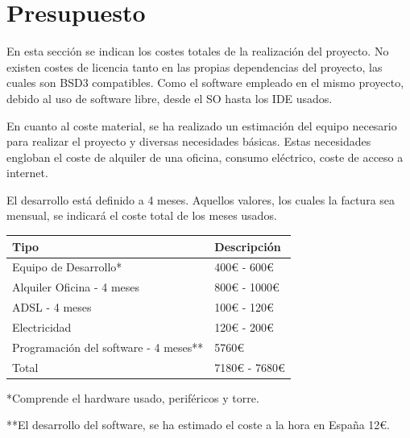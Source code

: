 \documentclass[11pt]{article}
\begin{document}
\section{Presupuesto}
\label{sec:orgf4fb4df}

En esta sección se indican los costes totales de la realización del proyecto. No existen costes de
licencia tanto en las propias dependencias del proyecto, las cuales son BSD3 compatibles. Como el software
empleado en el mismo proyecto, debido al uso de software libre, desde el SO hasta los IDE usados.

En cuanto al coste material, se ha realizado un estimación del equipo necesario para realizar el proyecto y diversas necesidades básicas.
Estas necesidades engloban el coste de alquiler de una oficina, consumo eléctrico, coste de acceso a internet.

El desarrollo está definido a 4 meses. Aquellos valores, los cuales la factura sea mensual, se indicará el coste total de los meses usados.

\begin{center}
\begin{tabular}{ll}
Tipo & Descripción\\
\hline
Equipo de Desarrollo* & 400€ - 600€\\
Alquiler Oficina - 4 meses & 800€ - 1000€\\
ADSL - 4 meses & 100€ - 120€\\
Electricidad & 120€ - 200€\\
Programación del software - 4 meses** & 5760€\\
\hline
Total & 7180€ - 7680€\\
\end{tabular}
\end{center}

*Comprende el hardware usado, periféricos y torre.

**El desarrollo del software, se ha estimado el coste a la hora en España 12€.


\renewcommand{\refname}{Bibliografía}

\newpage



\end{document}
